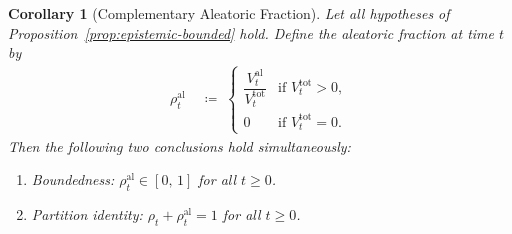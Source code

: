 \documentclass[12pt,openany]{book}
\numberwithin{equation}{chapter}
\theoremstyle{plain}
\newtheorem{corollary}[theorem]{Corollary}
\theoremstyle{definition}
\theoremstyle{remark}
\numberwithin{equation}{chapter}
\theoremstyle{plain}
\begin{document}
\begin{corollary}[Complementary Aleatoric Fraction]
\label{cor:aleatoric-frac}
Let all hypotheses of Proposition~\ref{prop:epistemic-bounded} hold.
Define the \emph{aleatoric fraction} at time $t$ by
\begin{align}
  \rho^{\mathrm{al}}_t
  &\;\coloneqq\;
  \begin{cases}
    \dfrac{V^{\mathrm{al}}_t}{V^{\mathrm{tot}}_t}
      & \text{if } V^{\mathrm{tot}}_t > 0, \\[6pt]
    0 & \text{if } V^{\mathrm{tot}}_t = 0.
  \end{cases}
  \label{eq:rhoal-def}
\end{align}
Then the following two conclusions hold simultaneously:
\begin{enumerate}
  \item \emph{Boundedness:}
        $\rho^{\mathrm{al}}_t \in [0,\,1]$ for all $t \geq 0$.
  \item \emph{Partition identity:}
        $\rho_t + \rho^{\mathrm{al}}_t = 1$ for all $t \geq 0$.
\end{enumerate}
\end{corollary}
\end{document}
